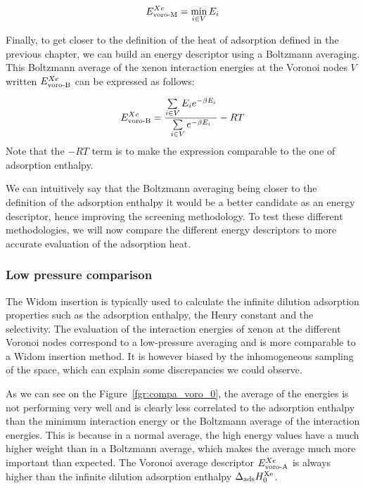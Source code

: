 \documentclass[main]{subfiles}
\begin{document}
\begin{equation}
    E_{\text{voro-M}}^{Xe} = \min_{i \in V} E_i
\end{equation}

Finally, to get closer to the definition of the heat of adsorption defined in the previous chapter, we can build an energy descriptor using a Boltzmann averaging. This Boltzmann average of the xenon interaction energies at the Voronoi nodes $V$ written $E_{\text{voro-B}}^{Xe}$ can be expressed as follows:

\begin{equation}
    E_{\text{voro-B}}^{Xe} = \dfrac{\sum\limits_{i \in V} E_i e^{-\beta E_i}}{\sum\limits_{i \in V} e^{-\beta E_i}} -RT
\end{equation}
Note that the $-RT$ term is to make the expression comparable to the one of adsorption enthalpy. 

We can intuitively say that the Boltzmann averaging being closer to the definition of the adsorption enthalpy it would be a better candidate as an energy descriptor, hence improving the screening methodology. To test these different methodologies, we will now compare the different energy descriptors to more accurate evaluation of the adsorption heat. 

\subsubsection{Low pressure comparison}

The Widom insertion is typically used to calculate the infinite dilution adsorption properties such as the adsorption enthalpy, the Henry constant and the selectivity. The evaluation of the interaction energies of xenon at the different Voronoi nodes correspond to a low-pressure averaging and is more comparable to a Widom insertion method. It is however biased by the inhomogeneous sampling of the space, which can explain some discrepancies we could observe.

As we can see on the Figure~\ref{fgr:compa_voro_0}, the average of the energies is not performing very well and is clearly less correlated to the adsorption enthalpy than the minimum interaction energy or the Boltzmann average of the interaction energies. This is because in a normal average, the high energy values have a much higher weight than in a Boltzmann average, which makes the average much more important than expected. The Voronoi average descriptor $E_{\text{voro-A}}^{Xe}$ is always higher than the infinite dilution adsorption enthalpy $\Delta_{\text{ads}} H_{0}^{\text{Xe}}$. 
\end{document}
